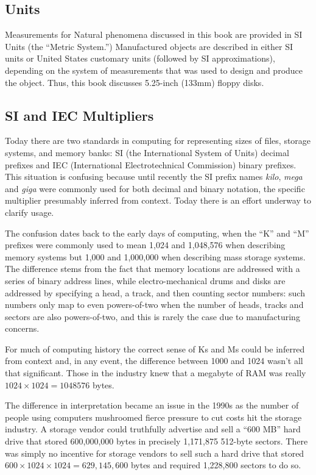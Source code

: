 \subsection{Units}

Measurements for Natural phenomena discussed in this book are provided
in SI Units (the ``Metric System.'')
Manufactured objects are described in either SI units or
United States customary units (followed by SI approximations), depending on the system of measurements
that was used to design and produce the object. Thus, this book
discusses 5.25-inch (133mm) floppy disks.

\subsection{SI and IEC Multipliers}\label{sec:si-and-iec}

Today there are two standards in computing for representing sizes of
files, storage systems, and memory banks: SI (the International System
of Units) decimal prefixes and IEC (International Electrotechnical
Commission) binary prefixes. This situation is confusing because until
recently the SI prefix names \emph{kilo}, \emph{mega} and \emph{giga} were commonly used
for both decimal and binary notation, the specific multiplier presumably
inferred from context. Today there is an effort underway to clarify
usage. 

The confusion dates back to the early days of computing, when the ``K''
and ``M'' prefixes were commonly used to mean 1,024 and 1,048,576
when describing memory systems but 1,000 and 1,000,000 when
describing mass storage systems. The difference stems
from the fact that memory locations are  addressed
with a series of binary address lines, while electro-mechanical drums and
disks are addressed by specifying a head, a track, and then counting
sector numbers: such numbers only map to even powers-of-two when the
number of heads, tracks and sectors are also powers-of-two, and
this is rarely the case due to manufacturing concerns.

For much of computing history the correct sense of Ks and Ms could be
inferred from context and, in any event, the difference between 1000
and 1024 wasn't all that significant. Those in the industry knew that
a megabyte of RAM was really $1024\times1024=1048576$ bytes.

The difference in interpretation became an issue in the 1990s as the
number of people using computers mushroomed fierce pressure to cut
costs hit the storage industry. A storage vendor could truthfully
advertise and sell a ``600 MB''
hard drive that stored 600,000,000 bytes in
precisely 1,171,875 512-byte sectors. There was simply no incentive
for storage vendors to sell such a hard drive that stored
$600\times1024\times1024=629,145,600$ bytes and required 1,228,800
sectors to do so.

